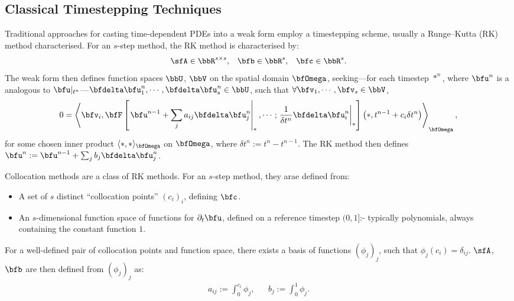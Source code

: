 \subsection{Classical Timestepping Techniques}
    Traditional approaches for casting time-dependent PDEs into a weak form employ a timestepping scheme, usually a Runge–Kutta (RK) method characterised. For an $s$-step method, the RK method is characterised by:
    \begin{align}
        \sfA  \in  \bbR^{s \times s},  &&
        \bfb  \in  \bbR^{s},  &&
        \bfc  \in  \bbR^{s}.
    \end{align}
    The weak form then defines function spaces $\bbU$, $\bbV$ on the spatial domain $\bfOmega$, seeking—for each timestep $*^{n}$, where $\bfu^{n}$ is a analogous to $\bfu|_{t^{n}}$—$\bfdelta\bfu^{n}_{1}, \cdots, \bfdelta\bfu^{n}_{s}  \in  \bbU$, such that $\forall  \bfv_{1}, \cdots, \bfv_{s}  \in  \bbV$,
    \begin{equation}
        0  =  \left\langle\bfv_{i}, \bfF\left[\left.\bfu^{n - 1} + \sum_{j}a_{ij}\bfdelta\bfu^{n}_{j}\right|_{*}, \cdots; \left.\frac{1}{\delta t^{n}}\bfdelta\bfu^{n}_{i}\right|_{*}\right]\left(*, t^{n - 1} + c_{i}\delta t^{n}\right)\right\rangle_{\bfOmega},
    \end{equation}
    for some chosen inner product $\langle*, *\rangle_{\bfOmega}$ on $\bfOmega$, where $\delta t^{n}  :=  t^{n} - t^{n - 1}$. The RK method then defines $\bfu^{n}  :=  \bfu^{n - 1} + \sum_{j}b_{j}\bfdelta\bfu^{n}_{j}$.

    \line
    \begin{definition}
        Collocation methods are a class of RK methods. For an $s$-step method, they arae defined from:
        \begin{itemize}
            \item  A set of $s$ distinct ``collocation points'' $(c_{i})_{i}$, defining $\bfc$.
            \item  An $s$-dimensional function space of functions for $\partial_{t}\bfu$, defined on a reference timestep $(0, 1]$:- typically polynomials, always containing the constant function $1$.
        \end{itemize}
        For a well-defined pair of collocation points and function space, there exists a basis of functions $(\phi_{j})_{j}$, such that $\phi_{j}(c_{i})  =  \delta_{ij}$. $\sfA$, $\bfb$ are then defined from $(\phi_{j})_{j}$ as:
        \begin{align}
            a_{ij}  :=  \int_{0}^{c_{i}}\phi_{j},  &&
            b_{j}   :=  \int_{0}^{1}\phi_{j}.
        \end{align}
    \end{definition}
    

